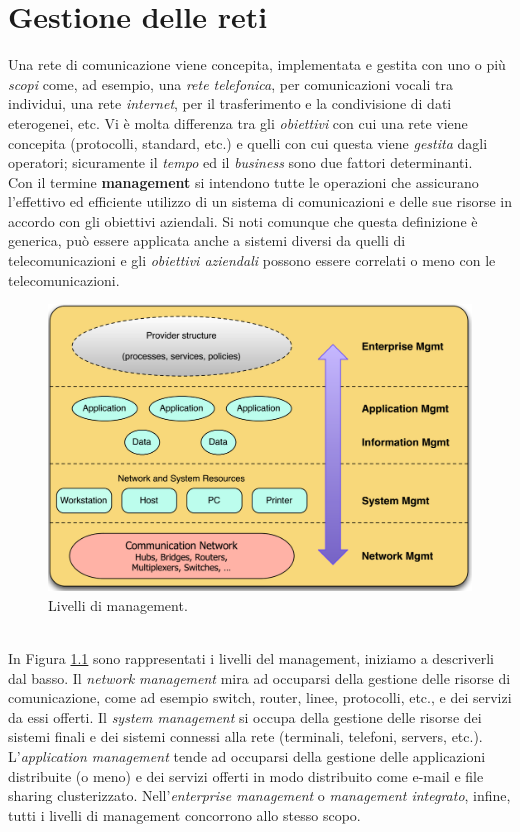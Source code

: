 \chapter{Gestione delle reti}
Una rete di comunicazione viene concepita, implementata e gestita con uno o più \textit{scopi} come, ad esempio, una \textit{rete telefonica}, per comunicazioni vocali tra individui, una rete \textit{internet}, per il trasferimento e la condivisione di dati eterogenei, etc. Vi è molta differenza tra gli \textit{obiettivi} con cui una rete viene concepita (protocolli, standard, etc.) e quelli con cui questa viene \textit{gestita} dagli operatori; sicuramente il \textit{tempo} ed il \textit{business} sono due fattori determinanti.\\
Con il termine \textbf{management} si intendono tutte le operazioni che assicurano l'effettivo ed efficiente utilizzo di un sistema di comunicazioni e delle sue risorse in accordo con gli obiettivi aziendali. Si noti comunque che questa definizione è generica, può essere applicata anche a sistemi diversi da quelli di telecomunicazioni e gli \textit{obiettivi aziendali} possono essere correlati o meno con le telecomunicazioni.
\begin{figure}[htbp]
	\centering
	\includegraphics[scale = 0.4]{images/management_levels}
	\caption{Livelli di management.}
	\label{img:management_levels}
\end{figure}\\
In Figura \ref*{img:management_levels} sono rappresentati i livelli del management, iniziamo a descriverli dal basso. Il \textit{network management} mira ad occuparsi della gestione delle risorse di comunicazione, come ad esempio switch, router, linee, protocolli, etc., e dei servizi da essi offerti. Il \textit{system management} si occupa della gestione delle risorse dei sistemi finali e dei sistemi connessi alla rete (terminali, telefoni, servers, etc.). L'\textit{application management} tende ad occuparsi della gestione delle applicazioni distribuite (o meno) e dei servizi offerti in modo distribuito come e-mail e file sharing clusterizzato. Nell'\textit{enterprise management} o \textit{management integrato}, infine, tutti i livelli di management concorrono allo stesso scopo.
